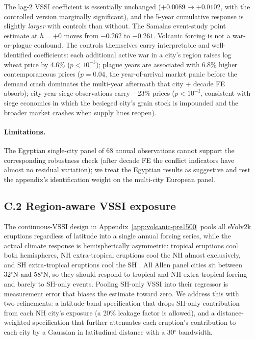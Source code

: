 \documentclass[11pt,letterpaper]{article}
\begin{document}
The lag-2 VSSI coefficient is essentially unchanged ($+0.0089 \to +0.0102$, with the controlled version marginally significant), and the 5-year cumulative response is slightly \emph{larger} with controls than without. The Samalas event-study point estimate at $h=+0$ moves from $-0.262$ to $-0.261$. Volcanic forcing is not a war-or-plague confound. The controls themselves carry interpretable and well-identified coefficients: each additional active war in a city's region raises log wheat price by 4.6\% ($p < 10^{-3}$); plague years are associated with 6.8\% higher contemporaneous prices ($p = 0.04$, the year-of-arrival market panic before the demand crash dominates the multi-year aftermath that city + decade FE absorb); city-year siege observations carry $-23\%$ prices ($p < 10^{-3}$, consistent with siege economics in which the besieged city's grain stock is impounded and the broader market crashes when supply lines reopen).

\paragraph{Limitations.} The Egyptian single-city panel of 68 annual observations cannot support the corresponding robustness check (after decade FE the conflict indicators have almost no residual variation); we treat the Egyptian results as suggestive and rest the appendix's identification weight on the multi-city European panel.

\subsection*{C.2 Region-aware VSSI exposure}
\label{app:regional-vssi}

The continuous-VSSI design in Appendix~\ref{app:volcanic-pre1500} pools all eVolv2k eruptions regardless of latitude into a single annual forcing series, while the actual climate response is hemispherically asymmetric: tropical eruptions cool both hemispheres, NH extra-tropical eruptions cool the NH almost exclusively, and SH extra-tropical eruptions cool the SH \citep{toohey2017}. All Allen panel cities sit between 32$^\circ$N and 58$^\circ$N, so they should respond to tropical and NH-extra-tropical forcing and barely to SH-only events. Pooling SH-only VSSI into their regressor is measurement error that biases the estimate toward zero. We address this with two refinements: a latitude-band specification that drops SH-only contribution from each NH city's exposure (a 20\% leakage factor is allowed), and a distance-weighted specification that further attenuates each eruption's contribution to each city by a Gaussian in latitudinal distance with a 30$^\circ$ bandwidth.
\end{document}
